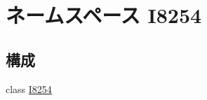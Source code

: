 \hypertarget{namespaceI8254}{
\section{ネームスペース I8254}
\label{namespaceI8254}
}
\subsection*{構成}
\begin{DoxyCompactItemize}
\item 
class \hyperlink{classI8254_1_1I8254}{I8254}
\end{DoxyCompactItemize}
